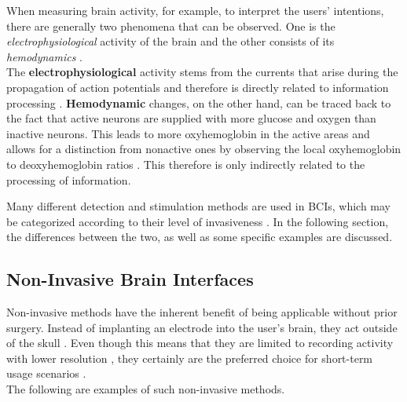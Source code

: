     When measuring brain activity, for example, to interpret the users' intentions, there are generally two phenomena that can be observed. One is the \textit{electrophysiological} activity of the brain and the other consists of its \textit{hemodynamics} \cite{NicolasAlonso.2012}. \\
    The \textbf{electrophysiological} activity stems from the currents that arise during the propagation of action potentials and therefore is directly related to information processing \cite{Baillet.2001}.
    \textbf{Hemodynamic} changes, on the other hand, can be traced back to the fact that active neurons are supplied with more glucose and oxygen than inactive neurons. This leads to more oxyhemoglobin in the active areas and allows for a distinction from nonactive ones by observing the local oxyhemoglobin to deoxyhemoglobin ratios \cite{Laureys.2014}. This therefore is only indirectly related to the processing of information.
    
    Many different detection and stimulation methods are used in BCIs, which may be categorized according to their level of invasiveness \cite{Bernal.2023}. In the following section, the differences between the two, as well as some specific examples are discussed.
        

    \subsection{Non-Invasive Brain Interfaces}
        Non-invasive methods have the inherent benefit of being applicable without prior surgery. Instead of implanting an electrode into the user's brain, they act outside of the skull \cite{WilliamJ.Tyler.2017}. Even though this means that they are limited to recording activity with lower resolution \cite{Lebedev.2006}, they certainly are the preferred choice for short-term usage scenarios \cite{Luan.2014}. \\
        The following are examples of such non-invasive methods.
        
